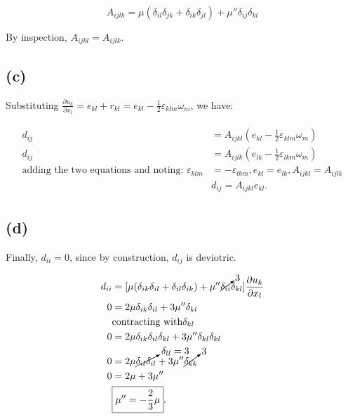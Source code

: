 \documentclass{article}
\begin{document}
$$
A_{ijlk} = \mu (\delta_{il}\delta_{jk} + \delta_{ik}\delta_{jl}) + \mu'' \delta_{ij}\delta_{kl}
$$

By inspection, $A_{ijkl} = A_{ijlk}$. 

\subsection*{(c)}
Substituting $\frac{\partial u_{k}}{\partial x_{l}} = e_{kl} + r_{kl} = e_{kl} - \frac{1}{2} \varepsilon_{klm}\omega_{m}$, we have:

\begin{align}
 \begin{split}
  d_{ij} &= A_{ijkl} (e_{kl} - \frac{1}{2} \varepsilon_{klm}\omega_{m}) \\
  d_{ij} &= A_{ijlk}(e_{lk} - \frac{1}{2} \varepsilon_{lkm}\omega_{m}) \\
  \textrm{adding the two equations and noting: } \varepsilon_{klm} &= -\varepsilon_{lkm}, e_{kl} =e_{lk}, A_{ijkl} = A_{ijlk}  \\
  &\boxed{d_{ij} = A_{ijkl} e_{kl}}.
 \end{split}
\end{align}
\subsection*{(d)}
Finally, $d_{ii} = 0$, since by construction, $d_{ij}$ is deviotric.

\begin{align}
 \begin{split}
  d_{ii} & =[ \mu (\delta_{ik}\delta_{il} + \delta_{il}\delta_{ik}) + \mu'' \cancelto{3}{\delta_{ii}}\delta_{kl}] \frac{\partial u_{k}}{\partial x_{l}}\\
  0 &= 2 \mu \delta_{ik}\delta_{il} + 3 \mu'' \delta_{kl}\\
  & \textrm{contracting with} \delta_{kl} \\
  0 & =2 \mu \delta_{ik}\delta_{il}\delta_{kl} + 3 \mu'' \delta_{kl}\delta_{kl}\\
  0 &= 2 \mu \cancelto{\delta_{ll} = 3}{\delta_{il}\delta_{il}} + 3 \mu'' \cancelto{3}{\delta_{kk}}\\
  0 &= 2\mu + 3 \mu'' \\
  & \boxed{\mu'' = -\frac{2}{3} \mu}.
 \end{split}
\end{align}
\end{document}
